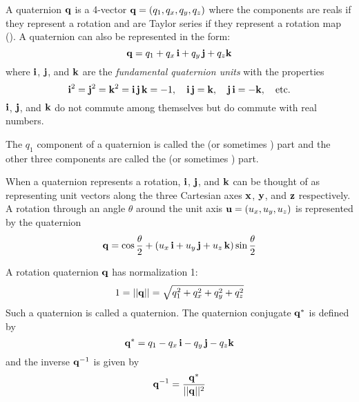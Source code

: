 {A quaternion ${\bf q}$ is a 4-vector ${\bf q} = (q_1, q_x, q_y, q_z)$ where the components are reals if they represent a
rotation and are Taylor series if they represent a rotation map (). A quaternion can
also be represented in the form:
\begin{equation}
  {\bf q} = q_1 + q_x \, {\bf i} + q_y \, {\bf j} + q_z {\bf k}
  \label{qqqqq}
\end{equation}
where ${\bf i}$, ${\bf j}$, and ${\bf k}$ are the {\em fundamental quaternion units} with the properties
\begin{equation}
  {\bf i}^2 = {\bf j}^2 = {\bf k}^2 = {\bf i} \, {\bf j} \, {\bf k} = -1, \quad 
  {\bf i} \, {\bf j} = {\bf k}, \quad {\bf j} \, {\bf i} = -{\bf k}, \quad \text{etc.}
\end{equation}
${\bf i}$, ${\bf j}$, and ${\bf k}$ do not commute among themselves but do commute with real numbers.

The $q_1$ component of a quaternion is called the  (or sometimes ) part and the other
three components are called the  (or sometimes ) part.

When a quaternion represents a rotation, ${\bf i}$, ${\bf j}$, and ${\bf k}$ can be thought of as representing unit
vectors along the three Cartesian axes ${\bf x}$, ${\bf y}$, and ${\bf z}$ respectively. A rotation through an angle
$\theta$ around the unit axis ${\bf u} = (u_x, u_y, u_z)$ is represented by the quaternion
\begin{equation}
  {\bf q} = \cos\frac{\theta}{2} + (u_x \, {\bf i} + u_y \, {\bf j} + u_z \, {\bf k}) \sin\frac{\theta}{2}
  \label{qt2ui}
\end{equation}

A rotation quaternion ${\bf q}$ has normalization 1:
\begin{equation}
  1 = ||{\bf q}|| = \sqrt{q_1^2 + q_x^2 + q_y^2 + q_z^2}
\end{equation}
Such a quaternion is called a  quaternion.
The quaternion conjugate ${\bf q}^*$ is defined by
\begin{equation}
  {\bf q}^* = q_1 - q_x \, {\bf i} - q_y \, {\bf j} - q_z {\bf k}
\end{equation}
and the inverse ${\bf q}^{-1}$ is given by
\begin{equation}
  {\bf q}^{-1} = \frac{{\bf q}^*}{||{\bf q}||^2}
\end{equation}

}
